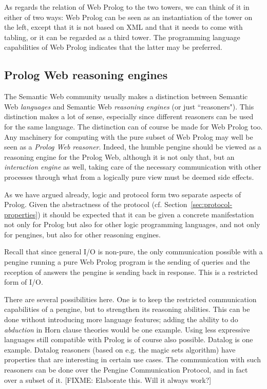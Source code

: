 \documentclass{tlp}
\begin{document}
As regards the relation of Web Prolog to the two towers, we can think of it in either of two ways: Web Prolog can be seen as an instantiation of the tower on the left, except that it is not based on XML and that it needs to come with tabling, or it can be regarded as a third tower. The programming language capabilities of Web Prolog indicates that the latter may be preferred.


\subsection{Prolog Web reasoning engines}\label{sec:prolog-web-reasoners}

\noindent The Semantic Web community usually makes a distinction between Semantic Web \textit{languages} and Semantic Web \textit{reasoning engines} (or just ``reasoners"). This distinction makes a lot of sense, especially since different reasoners can be used for the same language. The distinction can of course be made for Web Prolog too. Any machinery for computing with the pure subset of Web Prolog may well be seen as a \textit{Prolog Web reasoner}. Indeed, the humble pengine should be viewed as a reasoning engine for the Prolog Web, although it is not only that, but an \textit{interaction engine} as well, taking care of the necessary communication with other processes through what from a logically pure view must be deemed side effects.

As we have argued already, logic and protocol form two separate aspects of Prolog. Given the abstractness of the protocol (cf. Section~\ref{sec:protocol-properties}) it should be expected that it can be given a concrete manifestation not only for Prolog but also for other logic programming languages, and not only for pengines, but also for other reasoning engines.

Recall that since general I/O is non-pure, the only communication possible with a pengine running a pure Web Prolog program is the sending of queries and the reception of answers the pengine is sending back in response. This is a restricted form of I/O.

There are several possibilities here. One is to keep the restricted communication capabilities of a pengine, but to strengthen its reasoning abilities. This can be done without introducing more language features; adding the ability to do \textit{abduction} in Horn clause theories would be one example. Using less expressive languages still compatible with Prolog is of course also possible. Datalog is one example. Datalog reasoners (based on e.g. the magic sets algorithm) have properties that are interesting in certain use cases. The communication with such reasoners can be done over the Pengine Communication Protocol, and in fact over a subset of it. [FIXME: Elaborate this. Will it always work?]
\end{document}
